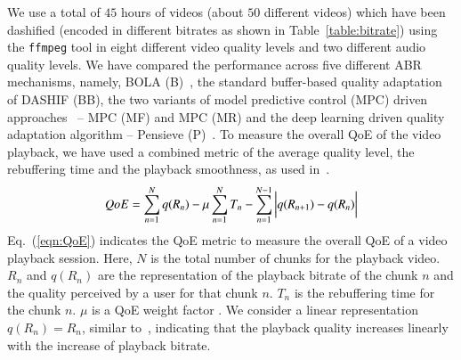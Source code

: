 We use a total of $45$ hours of videos (about $50$ different videos) which have been dashified (encoded in different bitrates as shown in Table~\ref{table:bitrate}) using the {\tt ffmpeg} tool in eight different video quality levels and two different audio quality levels.  
We have compared the performance across five different ABR mechanisms, namely, BOLA (B)~\cite{bola-2016}, the standard buffer-based quality adaptation of DASHIF (BB), the two variants of model predictive control (MPC) driven approaches~\cite{yin2015control} -- MPC (MF) and MPC (MR) and the deep learning driven quality adaptation algorithm -- Pensieve (P)~\cite{mao2017neural}. To measure the overall QoE of the video playback, we have used a combined metric of the average quality level, the rebuffering time and the playback smoothness, as used in~\cite{yin2015control,mao2017neural}.
\begin{equation}
QoE=\sum_{n=1}^{N}q(R_n)-\mu\sum_{n=1}^{N}T_n-\sum_{n=1}^{N{-1}} \bigg\vert q(R_{n+1})-q(R_n)  \bigg\vert
\label{eqn:QoE}
\end{equation}
Eq.~(\ref{eqn:QoE}) indicates the QoE metric to measure the overall QoE of a video playback session. Here, $N$ is the total number of chunks for the playback video. $R_n$ and $q(R_n)$ are the representation of the playback bitrate of the chunk $n$ and the quality perceived by a user for that chunk $n$. $T_n$ is the rebuffering time for the chunk $n$. $\mu$ is a QoE weight factor \cite{yin2015control}. 
We consider a linear representation $q(R_n) = R_n$, similar to~\cite{yin2015control}, indicating that the playback quality increases linearly with the increase of playback bitrate. 
%

